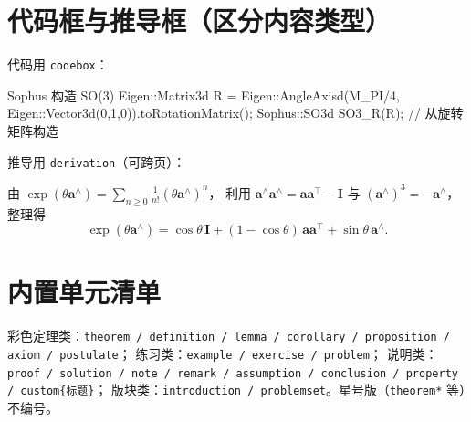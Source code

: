 \section{代码框与推导框（区分内容类型）}
代码用 \texttt{codebox}：
\begin{codebox}[C++]{Sophus 构造 SO(3)}
Eigen::Matrix3d R = Eigen::AngleAxisd(M_PI/4,
                      Eigen::Vector3d(0,1,0)).toRotationMatrix();
Sophus::SO3d SO3_R(R);   // 从旋转矩阵构造
\end{codebox}

推导用 \texttt{derivation}（可跨页）：
\begin{derivation}[罗德里格斯公式]
由 $\exp(\theta\mathbf{a}^\wedge)=\sum_{n\ge 0}\tfrac{1}{n!}(\theta\mathbf{a}^\wedge)^n$，
利用 $\mathbf{a}^\wedge\mathbf{a}^\wedge=\mathbf{a}\mathbf{a}^\top-\mathbf{I}$ 与 $(\mathbf{a}^\wedge)^3=-\mathbf{a}^\wedge$，整理得
\begin{equation*}
  \exp(\theta\mathbf{a}^\wedge)=\cos\theta\,\mathbf{I}+(1-\cos\theta)\,\mathbf{a}\mathbf{a}^\top+\sin\theta\,\mathbf{a}^\wedge .
\end{equation*}
\end{derivation}

\section{内置单元清单}
彩色定理类：\texttt{theorem / definition / lemma / corollary / proposition / axiom / postulate}；
练习类：\texttt{example / exercise / problem}；
说明类：\texttt{proof / solution / note / remark / assumption / conclusion / property / custom\{标题\}}；
版块类：\texttt{introduction / problemset}。星号版（\texttt{theorem*} 等）不编号。
